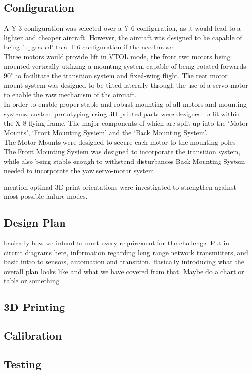 \subsection{Configuration}
A Y-3 configuration was selected over a Y-6 configuration, as it would lead to a lighter and cheaper aircraft. However, the aircraft was designed to be capable of being 'upgraded' to a T-6 configuration if the need arose.\\
Three motors would provide lift in VTOL mode, the front two motors being mounted vertically utilizing a mounting system capable of being rotated forwards $90^{\circ}$ to facilitate the transition system and fixed-wing flight. The rear motor mount system was designed to be tilted laterally through the use of a servo-motor to enable the yaw mechanism of the aircraft.\\
In order to enable proper stable and robust mounting of all motors and mounting systems, custom prototyping using 3D printed parts were designed to fit within the X-8 flying frame. The major components of which are split up into the `Motor Mounts', `Front  Mounting System' and the `Back Mounting System'.\\
The Motor Mounts were designed to secure each motor to the mounting poles. 
The Front Mounting System was designed to incorporate the transition system, while also being stable enough to withstand disturbances
Back Mounting System needed to incorporate the yaw servo-motor system

mention optimal 3D print orientations were investigated to strengthen against most possible failure modes.

\subsection{Design Plan}
\color{red}
basically how we intend to meet every requirement for the challenge. Put in circuit diagrams here, information regarding long range network transmitters, and basic intro to sensors, automation and transition. Basically introducing what the overall plan looks like and what we have covered from that. Maybe do a chart or table or something
\color{black}
\subsection{3D Printing}

\subsection{Calibration}

\subsection{Testing}
